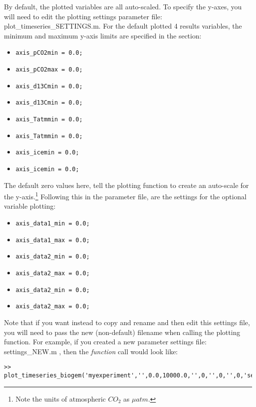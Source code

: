 \documentclass[11pt,fleqn]{book} %
\begin{document}
By default, the plotted variables are all auto-scaled. To specify the y-axes, you will need to edit the plotting settings parameter file: \footnotesize\textsf{plot\_timeseries\_SETTINGS.m}\normalsize. For the default plotted 4 results variables, the minimum and maximum y-axis limits are specified in the section:
\vspace{1mm}
\begin{itemize}
\item[] \texttt{axis\_pCO2min = 0.0;}
\item[] \texttt{axis\_pCO2max = 0.0;}
\item[] \texttt{axis\_d13Cmin = 0.0;}
\item[] \texttt{axis\_d13Cmin = 0.0;}
\item[] \texttt{axis\_Tatmmin = 0.0;}
\item[] \texttt{axis\_Tatmmin = 0.0;}
\item[] \texttt{axis\_icemin = 0.0;}
\item[] \texttt{axis\_icemin = 0.0;}
\end{itemize}
\vspace{2mm}
The default zero values here, tell the plotting function to create an auto-scale for the y-axis.\footnote{Note the units of atmospheric \(CO_{2}\) as \(\mu atm\).} Following this in the parameter file, are the settings for the optional variable plotting:
\vspace{1mm}
\begin{itemize}
\item[] \texttt{axis\_data1\_min = 0.0;}
\item[] \texttt{axis\_data1\_max = 0.0;}
\item[] \texttt{axis\_data2\_min = 0.0;}
\item[] \texttt{axis\_data2\_max = 0.0;}
\item[] \texttt{axis\_data2\_min = 0.0;}
\item[] \texttt{axis\_data2\_max = 0.0;}
\end{itemize}
\vspace{2mm}

Note that if you want instead to copy and rename and then edit this settings file, you will need to pass the new (non-default) filename when calling the plotting function. For example, if you created a new parameter settings file: \footnotesize\textsf{settings\_NEW.m }\normalsize, then the \textit{function} call would look like:
\small\begin{verbatim}
>> plot_timeseries_biogem('myexperiment','',0.0,10000.0,'',0,'',0,'',0,'settings_NEW','')
\end{verbatim}\normalsize
\end{document}
